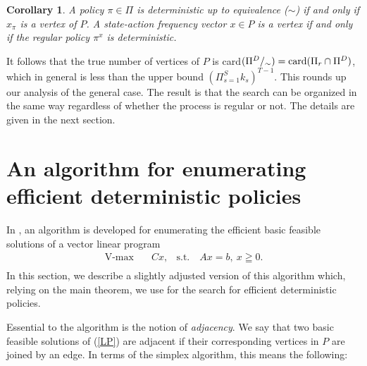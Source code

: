 \documentclass{article}
\newtheorem{corollary}[theorem]{Corollary}
\theoremstyle{definition}
\numberwithin{equation}{section}
\begin{document}
\begin{corollary}
A policy
$\pi \in \Pi$ is deterministic up to equivalence ($\sim$) if and only if $x_{\pi}$ is a vertex of 
$P$.
A state-action frequency vector
$x \in P$ is a vertex if and only if the regular policy $\pi^x$ is deterministic. 
\end{corollary}



It follows that the true number of vertices of $P$ is  card$(\Pi^D{/_{\sim}})= 
{\rm card}(\Pi_r \cap \Pi^D)$, 
which in general is less than the upper bound
$(\Pi_{s=1}^Sk_s)^{T-1}$.
This rounds up our analysis of the general case. The result is that the search can be organized
in the same way regardless of whether the process is regular or not. 
The details are given in the next section.
\\

\section{An algorithm for enumerating efficient deterministic policies}
\label{sect_algo}

In \cite{6}, an algorithm is developed for enumerating the efficient basic feasible solutions of a vector linear program 
\begin{equation*}
\begin{aligned}
\operatorname{V-max} \quad & Cx, & \textrm{s.t.} \quad Ax = b,\ x \geqq 0.\\
\end{aligned}
\end{equation*} 
In this section, we describe a slightly adjusted version of this algorithm which, relying on the main theorem, we use for the search for efficient deterministic policies. 


Essential to the algorithm is the notion of \textit{adjacency}. We say that two basic feasible solutions of (\ref{LP})
are adjacent if their corresponding vertices in $P$ are joined by an
edge.  
In terms of the simplex algorithm, this means the following:
\end{document}
